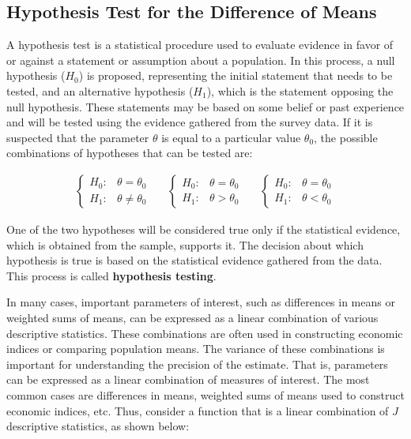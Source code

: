 \documentclass[
  12pt,
]{book}
\begin{document}
\hypertarget{hypothesis-test-for-the-difference-of-means}{%
\subsection{Hypothesis Test for the Difference of Means}\label{hypothesis-test-for-the-difference-of-means}}

A hypothesis test is a statistical procedure used to evaluate evidence in favor of or against a statement or assumption about a population. In this process, a null hypothesis (\(H_0\)) is proposed, representing the initial statement that needs to be tested, and an alternative hypothesis (\(H_1\)), which is the statement opposing the null hypothesis. These statements may be based on some belief or past experience and will be tested using the evidence gathered from the survey data. If it is suspected that the parameter \(\theta\) is equal to a particular value \(\theta_{0}\), the possible combinations of hypotheses that can be tested are:

\begin{eqnarray*}
\begin{cases}
H_{0}: & \theta=\theta_{0}\\
H_{1}: & \theta\neq\theta_{0}
\end{cases}\,\,\,\,\,\,\,\,\,   
\begin{cases}
H_{0}: & \theta=\theta_{0}\\
H_{1}: & \theta>\theta_{0}
\end{cases}\,\,\,\,\,\,\,\,\,   
\begin{cases}
H_{0}: & \theta=\theta_{0}\\
H_{1}: & \theta<\theta_{0}
\end{cases}
\end{eqnarray*}

One of the two hypotheses will be considered true only if the statistical evidence, which is obtained from the sample, supports it. The decision about which hypothesis is true is based on the statistical evidence gathered from the data. This process is called \textbf{hypothesis testing}.

In many cases, important parameters of interest, such as differences in means or weighted sums of means, can be expressed as a linear combination of various descriptive statistics. These combinations are often used in constructing economic indices or comparing population means. The variance of these combinations is important for understanding the precision of the estimate. That is, parameters can be expressed as a linear combination of measures of interest. The most common cases are differences in means, weighted sums of means used to construct economic indices, etc. Thus, consider a function that is a linear combination of \(J\) descriptive statistics, as shown below:
\end{document}
